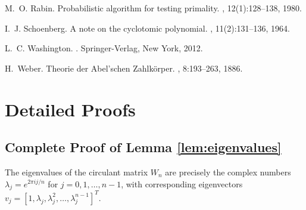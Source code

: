 \begin{thebibliography}{30}
M.~O. Rabin.
\newblock Probabilistic algorithm for testing primality.
, 12(1):128--138, 1980.

I.~J. Schoenberg.
\newblock A note on the cyclotomic polynomial.
, 11(2):131--136, 1964.

L.~C. Washington.
.
\newblock Springer-Verlag, New York, 2012.

H.~Weber.
\newblock Theorie der {A}bel'schen {Z}ahlkörper.
, 8:193--263, 1886.

\end{thebibliography}

\appendix

\section{Detailed Proofs}

\subsection{Complete Proof of Lemma \ref{lem:eigenvalues}}

\begin{lemma}
The eigenvalues of the circulant matrix $W_n$ are precisely the complex numbers $\lambda_j = e^{2\pi i j/n}$ for $j = 0, 1, \ldots, n-1$, with corresponding eigenvectors $v_j = [1, \lambda_j, \lambda_j^2, \ldots, \lambda_j^{n-1}]^T$.
\end{lemma}

